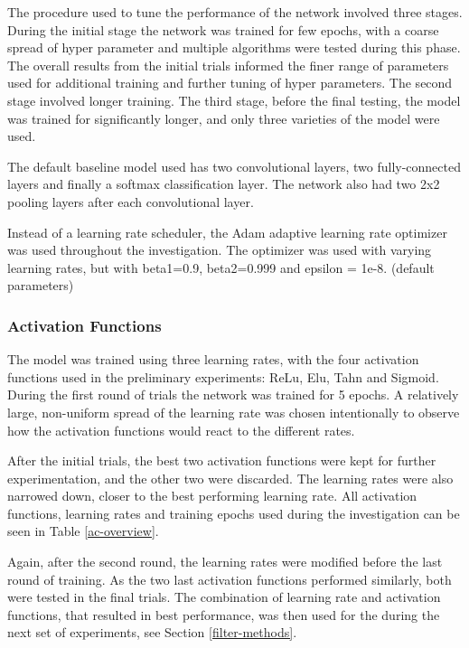 \documentclass[]{article}
\begin{document}
The procedure used to tune the performance of the network involved three stages. During the initial stage the network was trained for few epochs, with a coarse spread of hyper parameter and multiple algorithms were tested during this phase. The overall results from the initial trials informed the finer range of parameters used for additional training and further tuning of hyper parameters. The second stage involved longer training. The third stage, before the final testing, the model was trained for significantly longer, and only three varieties of the model were used. 

The default baseline model used has two convolutional layers, two fully-connected layers and finally a softmax classification layer. The network also had two 2x2 pooling layers after each convolutional layer. 

Instead of a learning rate scheduler, the Adam adaptive learning rate optimizer was used throughout the investigation. The optimizer was used with varying learning rates, but with beta1=0.9, beta2=0.999 and epsilon = 1e-8. (default parameters) 

\subsubsection{Activation Functions}

The model was trained using three learning rates, with the four activation functions used in the preliminary experiments: ReLu, Elu, Tahn and Sigmoid. During the first round of trials the network was trained for 5 epochs. A relatively large, non-uniform spread of the learning rate was chosen intentionally to observe how the activation functions would react to the different rates. 

After the initial trials, the best two activation functions were kept for further experimentation, and the other two were discarded. The learning rates were also narrowed down, closer to the best performing learning rate. All activation functions, learning rates and training epochs used during the investigation can be seen in Table \ref{ac-overview}.

Again, after the second round, the learning rates were modified before the last round of training. As the two last activation functions performed similarly, both were tested in the final trials. The combination of learning rate and activation functions, that resulted in best performance, was then used for the during the next set of experiments, see Section \ref{filter-methods}.
\end{document}
